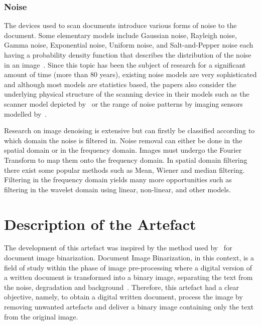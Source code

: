 \documentclass[a4paper, 12pt]{report}
\begin{document}
\subsection{Noise}
The devices used to scan documents introduce various forms of noise to the document. Some elementary models include Gaussian noise, Rayleigh noise, Gamma noise, Exponential noise, Uniform noise, and Salt-and-Pepper noise each having a probability density function that describes the distribution of the noise in an image~\cite{gonzalez_woods_pearson_hall}. Since this topic has been the subject of research for a significant amount of time (more than 80 years), existing noise models are very sophisticated and although most models are statistics based, the papers also consider the underlying physical structure of the scanning device in their models such as the scanner model depicted by~\cite{gou2007robust} or the range of noise patterns by imaging sensors modelled by~\cite{lukas2006digital}.\par

Research on image denoising is extensive but can firstly be classified according to which domain the noise is filtered in. Noise removal can either be done in the spatial domain or in the frequency domain. Images must undergo the Fourier Transform to map them onto the frequency domain. In spatial domain filtering there exist some popular methods such as Mean, Wiener and median filtering. Filtering in the frequency domain yields many more opportunities such as filtering in the wavelet domain using linear, non-linear, and other models.







\chapter{Description of the Artefact}
The development of this artefact was inspired by the method used by~\cite{su2012robust} for document image binarization. Document Image Binarization, in this context, is a field of study within the phase of image pre-processing where a digital version of a written document is transformed into a binary image, separating the text from the noise, degradation and background~\cite{su2012robust}. Therefore, this artefact had a clear objective, namely, to obtain a digital written document, process the image by removing unwanted artefacts and deliver a binary image containing only the text from the original image.\par
\end{document}
